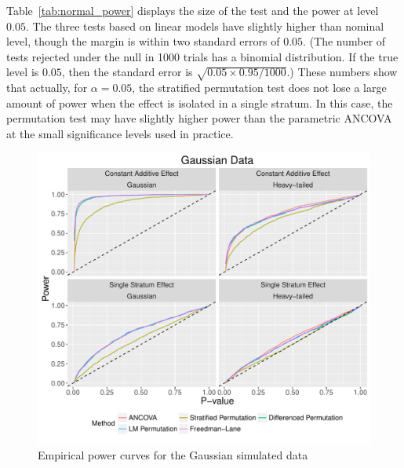 \documentclass[12pt]{article}
\begin{document}
Table~\ref{tab:normal_power} displays the size of the test and the power at level $0.05$.
The three tests based on linear models have slightly higher than nominal level, though the margin is within two standard errors of $0.05$.
(The number of tests rejected under the null in 1000 trials has a binomial distribution.
If the true level is $0.05$, then the standard error is $\sqrt{0.05 \times 0.95/1000}$.)
These numbers show that actually, for $\alpha=0.05$, the stratified permutation test does not lose a large amount of power when the effect is isolated in a single stratum.
In this case, the permutation test may have slightly higher power than the parametric ANCOVA at the small significance levels used in practice.
\begin{figure}[h]
\centering
\includegraphics[width = \textwidth]{fig/normal_simulation_power.pdf}
\caption{Empirical power curves for the Gaussian simulated data}
\label{fig:normal_sim_power}
\end{figure}
%
\end{document}
